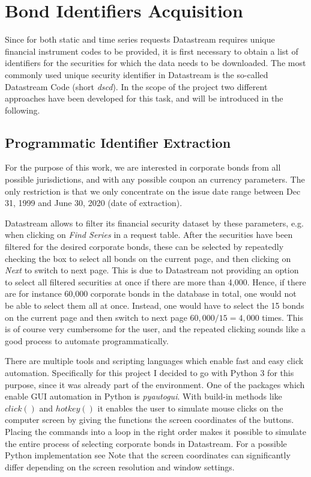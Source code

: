 \section{Bond Identifiers Acquisition} \label{section:bond-identifiers-acquisition}
Since for both static and time series requests Datastream requires unique financial instrument codes to be provided, it is first necessary to obtain a list of identifiers for the securities for which the data needs to be downloaded. The most commonly used unique security identifier in Datastream is the so-called Datastream Code (short \textit{dscd}). In the scope of the project two different approaches have been developed for this task, and will be introduced in the following. 

\subsection{Programmatic Identifier Extraction}
For the purpose of this work, we are interested in corporate bonds from all possible jurisdictions, and with any possible coupon an currency parameters. The only restriction is that we only concentrate on the issue date range between Dec 31, 1999 and June 30, 2020 (date of extraction). 

Datastream allows to filter its financial security dataset by these parameters, e.g. when clicking on \textit{Find Series} in a request table. After the securities have been filtered for the desired corporate bonds, these can be selected by repeatedly checking the box to select all bonds on the current page, and then clicking on \textit{Next} to switch to next page. This is due to Datastream not providing an option to select all filtered securities at once if there are more than 4,000. Hence, if there are for instance 60,000 corporate bonds in the database in total, one would not be able to select them all at once. Instead, one would have to select the 15 bonds on the current page and then switch to next page $60,000 / 15 = 4,000$ times. This is of course very cumbersome for the user, and the repeated clicking sounds like a good process to automate programmatically. 

There are multiple tools and scripting languages which enable fast and easy click automation. Specifically for this project I decided to go with Python 3 for this purpose, since it was already part of the environment. One of the packages which enable GUI automation in Python is \textit{pyautogui}. %
With build-in methods like $click()$ and $hotkey()$ it enables the user to simulate mouse clicks on the computer screen by giving the functions the screen coordinates of the buttons. Placing the commands into a loop in the right order makes it possible to simulate the entire process of selecting corporate bonds in Datastream. For a possible Python implementation see %
Note that the screen coordinates can significantly differ depending on the screen resolution and window settings. 

